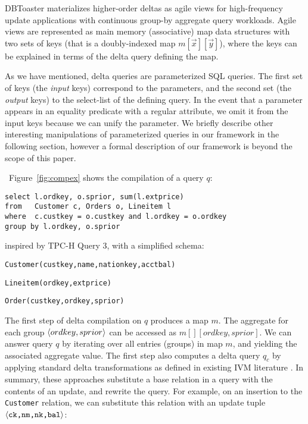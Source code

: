 DBToaster materializes higher-order deltas as agile views for high-frequency
update applications with continuous group-by aggregate query workloads. Agile
views are represented as main memory (associative) map data structures with two
sets of keys (that is a doubly-indexed map $m[\vec{x}][\vec{y}]$), where the
keys can be explained in terms of the delta query defining the map.

As we have mentioned, delta queries are parameterized SQL queries. The first set
of keys (the \textit{input} keys) correspond to the parameters, and the second
set (the \textit{output} keys) to the select-list of the defining query. In the
event that a parameter appears in an equality predicate with a regular
attribute, we omit it from the input keys because we can unify the parameter. We
briefly describe other interesting manipulations of parameterized queries in our
framework in the following section, however a formal description of our
framework is beyond the scope of this paper.

~Figure~\ref{fig:compex} shows the compilation of a query
$q$:

{\footnotesize\begin{verbatim}
select l.ordkey, o.sprior, sum(l.extprice)
from   Customer c, Orders o, Lineitem l
where  c.custkey = o.custkey and l.ordkey = o.ordkey
group by l.ordkey, o.sprior
\end{verbatim}}


\noindent inspired by TPC-H Query 3, with a simplified schema:

\vspace{1mm}
\texttt{Customer(custkey,name,nationkey,acctbal)}

\texttt{Lineitem(ordkey,extprice)}

\texttt{Order(custkey,ordkey,sprior)}

\vspace{1mm}
\noindent 
The first step of delta compilation on $q$ produces a map $m$. The aggregate for
each group ${\langle ordkey,sprior\rangle}$ can be accessed as $m[][ordkey,sprior]$. We
can answer query $q$ by iterating over all entries (groups) in map $m$, and
yielding the associated aggregate value.
The first step also computes a delta query $q_{c}$ by applying standard
delta transformations as defined in existing IVM literature
\cite{griffin-sigmod:95,roussopoulos-tods:91,zhou-icde:07,zhou-vldb:07}. In
summary, these approaches substitute a base relation in a query with the
contents of an update, and rewrite the query. For example, on an insertion to
the {\tt Customer} relation, we can substitute this relation
with an update tuple ${\langle\mbox{{\tt ck,nm,nk,bal}}\rangle}$:

